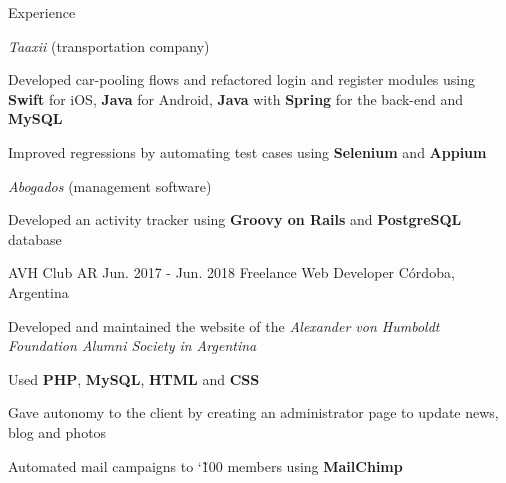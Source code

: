 \documentclass{curriculum}
\begin{document}
\begin{cvsection}{Experience}
\begin{sectionitemlist}
        \item{\textit{Taaxii} (transportation company)}
            \begin{sectionitemlist}
            \item{
                Developed car-pooling flows and refactored login and register
                modules using \textbf{Swift} for iOS, \textbf{Java} for Android,
                \textbf{Java} with \textbf{Spring} for the back-end and \textbf{MySQL}
            }
            \item{
                Improved regressions by automating test cases
                using \textbf{Selenium} and \textbf{Appium}
            }
            \end{sectionitemlist}

        \item{\textit{Abogados} (management software)}
            \begin{sectionitemlist}
            \item{
                Developed an activity tracker using
                \textbf{Groovy on Rails} and \textbf{PostgreSQL} database
            }
            \end{sectionitemlist}

        \end{sectionitemlist}


    \makesectionitemheader
        {AVH Club AR}                                       {Jun. 2017 - Jun. 2018}
        {Freelance Web Developer}                              {Córdoba, Argentina}

        \begin{sectionitemlist}
        \item{
            Developed and maintained the website of the \textit{Alexander von Humboldt
            Foundation Alumni Society in Argentina}
        }
        \item{
            Used \textbf{PHP}, \textbf{MySQL}, \textbf{HTML} and \textbf{CSS}
        }
        \item{
            Gave autonomy to the client by creating
            an administrator page to update news, blog and photos
        }
        \item{
            Automated mail campaigns to  \char`\~ 100
            members using \textbf{MailChimp}
        }
        \end{sectionitemlist}

\end{cvsection}
\end{document}
